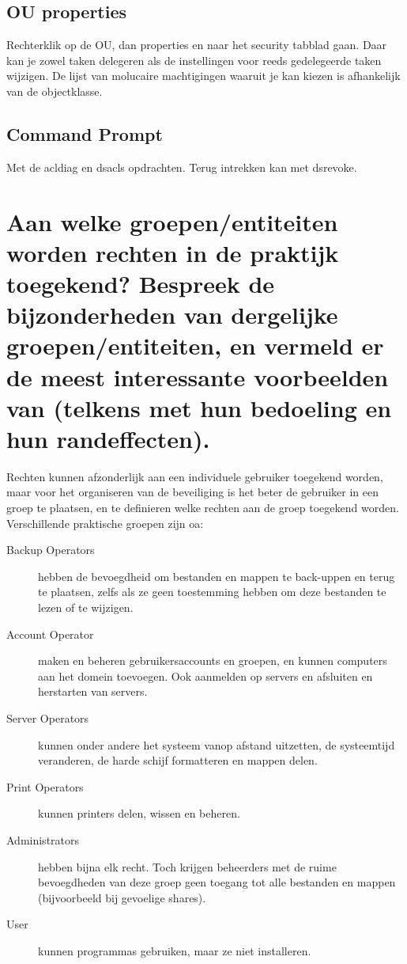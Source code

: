 \subsection{OU properties}

Rechterklik op de OU, dan properties en naar het security tabblad gaan. Daar kan
je zowel taken delegeren als de instellingen voor reeds gedelegeerde taken
wijzigen. De lijst van molucaire machtigingen waaruit je kan kiezen is
afhankelijk van de objectklasse.

\subsection{Command Prompt}

Met de acldiag en dsacls opdrachten. Terug intrekken kan met dsrevoke.

\section{Aan welke groepen/entiteiten worden rechten in de praktijk toegekend?
Bespreek de bijzonderheden van dergelijke groepen/entiteiten, en vermeld er de
meest interessante voorbeelden van (telkens met hun bedoeling en hun
randeffecten).}

Rechten kunnen afzonderlijk aan een individuele gebruiker toegekend worden, maar
voor het organiseren van de beveiliging is het beter de gebruiker in een groep
te plaatsen, en te definieren welke rechten aan de groep toegekend worden.
Verschillende praktische groepen zijn oa:

\begin{description}
	\item[Backup Operators] hebben de bevoegdheid om bestanden en mappen te
		back-uppen en terug te plaatsen, zelfs als ze geen toestemming
		hebben om deze bestanden te lezen of te wijzigen.
	\item[Account Operator] maken en beheren gebruikersaccounts en groepen,
		en kunnen computers aan het domein toevoegen. 
		Ook aanmelden op servers en afsluiten en herstarten van servers.
	\item[Server Operators] kunnen onder andere het systeem vanop afstand
		uitzetten, de systeemtijd veranderen, de harde schijf
		formatteren en mappen delen.
	\item[Print Operators] kunnen printers delen, wissen en beheren.
	\item[Administrators] hebben bijna elk recht. Toch krijgen beheerders
		met de ruime bevoegdheden van deze groep geen toegang tot alle
		bestanden en mappen (bijvoorbeeld bij gevoelige shares).
	\item[User] kunnen programmas gebruiken, maar ze niet installeren.
\end{description}

